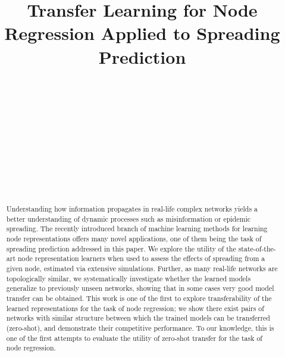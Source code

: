 \documentclass{article}
\begin{document}
\title{Transfer Learning for Node Regression Applied to Spreading Prediction} 

\author{\\[2pt] 
\\
\and
{}\\ [2pt]
\\
 \\
\and
{}\\[2pt]
\\
\\}


\maketitle

\begin{abstract}
Understanding how information propagates in real-life complex networks yields a better understanding of dynamic processes such as misinformation or epidemic spreading. The recently introduced branch of machine learning methods for learning node representations offers many novel applications, one of them being the task of spreading prediction addressed in this paper. We explore the utility of the state-of-the-art node representation learners when used to assess the effects of spreading from a given node, estimated via extensive simulations. Further, as many real-life networks are topologically similar, we systematically investigate whether the learned models generalize to previously unseen networks, showing that in some cases very good model transfer can be obtained. This work is one of the first to explore transferability of the learned representations for the task of node regression; we show there exist pairs of networks with similar structure between which the trained models can be transferred (zero-shot), and demonstrate their competitive performance. To our knowledge, this is one of the first attempts to evaluate the utility of zero-shot transfer for the task of node regression.
\end{abstract}
\end{document}
